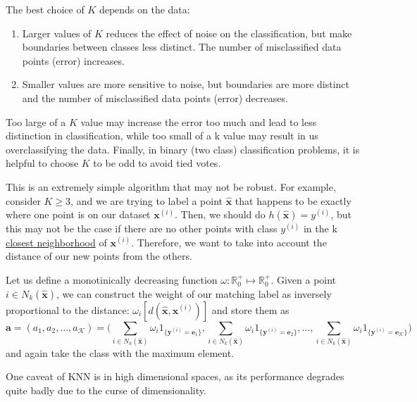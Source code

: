   The best choice of $K$ depends on the data: 
  \begin{enumerate}
    \item Larger values of $K$ reduces the effect of noise on the classification, but make boundaries between classes less distinct. The number of misclassified data points (error) increases. 
    \item Smaller values are more sensitive to noise, but boundaries are more distinct and the number of misclassified data points (error) decreases.
  \end{enumerate}
  Too large of a $K$ value may increase the error too much and lead to less distinction in classification, while too small of a k value may result in us overclassifying the data. Finally, in binary (two class) classification problems, it is helpful to choose $K$ to be odd to avoid tied votes.

  This is an extremely simple algorithm that may not be robust. For example, consider $K \geq 3$, and we are trying to label a point $\hat{\mathbf{x}}$ that happens to be exactly where one point is on our dataset $\mathbf{x}^{(i)}$. Then, we should do $h(\hat{\mathbf{x}}) = y^{(i)}$, but this may not be the case if there are no other points with class $y^{(i)}$ in the k \hyperref[def:closest-neighborhood]{closest neighborhood} of $\mathbf{x}^{(i)}$. Therefore, we want to take into account the distance of our new points from the others. 

  \begin{definition}
    \label{def:weighted-nearest-neighbor-classifier}
    Let us define a monotinically decreasing function $\omega: \mathbb{R}_0^+ \mapsto \mathbb{R}_0^+$. Given a point $i \in N_k (\hat{\mathbf{x}})$, we can construct the weight of our matching label as inversely proportional to the distance: $\omega_i [ d(\hat{\mathbf{x}}, \mathbf{x}^{(i)})]$ and store them as 
    \begin{equation}
      \mathbf{a} = (a_1, a_2, \ldots, a_\mathcal{K}) = \bigg( \sum_{i \in N_k (\hat{\mathbf{x}})} \omega_i 1_{\{\mathbf{y}^{(i)} = \mathbf{e}_1\}}, \sum_{i \in N_k (\hat{\mathbf{x}})} \omega_i 1_{\{\mathbf{y}^{(i)} = \mathbf{e}_2\}}, \ldots, \sum_{i \in N_k (\hat{\mathbf{x}})} \omega_i 1_{\{\mathbf{y}^{(i)} = \mathbf{e}_\mathcal{K}\}} \bigg)
    \end{equation}
    and again take the class with the maximum element. 
  \end{definition}

  One caveat of KNN is in high dimensional spaces, as its performance degrades quite badly due to the curse of dimensionality. 

